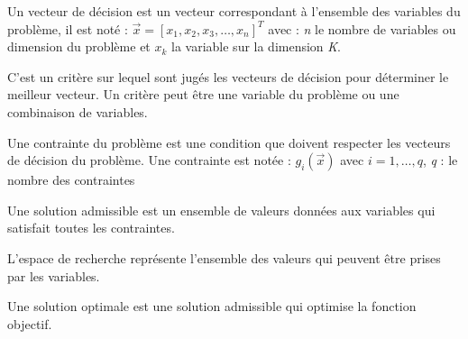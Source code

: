 \begin{definition}
	Un vecteur de décision est un vecteur correspondant à l'ensemble des variables du problème, il est noté : $\vec{x} = [x_1,x_2,x_3,…,x_n]^T$ avec : \emph{n} le nombre de variables ou dimension du problème et $x_k$ la variable sur la dimension \emph{K}.
\end{definition}

\begin{definition}
	C'est un critère sur lequel sont jugés les vecteurs de décision pour déterminer le meilleur vecteur. Un critère peut être une variable du problème ou une combinaison de variables.
\end{definition}

\begin{definition}[Contraintes]
	Une contrainte du problème est une condition que doivent respecter les vecteurs de décision du problème. Une contrainte est notée : $g_i (\vec{x})$ avec $i=1,…, q$, \emph{q} : le nombre des contraintes
\end{definition}

\begin{definition}
	Une solution admissible est un ensemble de valeurs données aux variables qui satisfait toutes les contraintes.
\end{definition}

\begin{definition}
	L'espace de recherche représente l'ensemble des valeurs qui peuvent être prises par les variables.
\end{definition}

\begin{definition}
	Une solution optimale est une solution admissible qui optimise la fonction objectif.
\end{definition}

